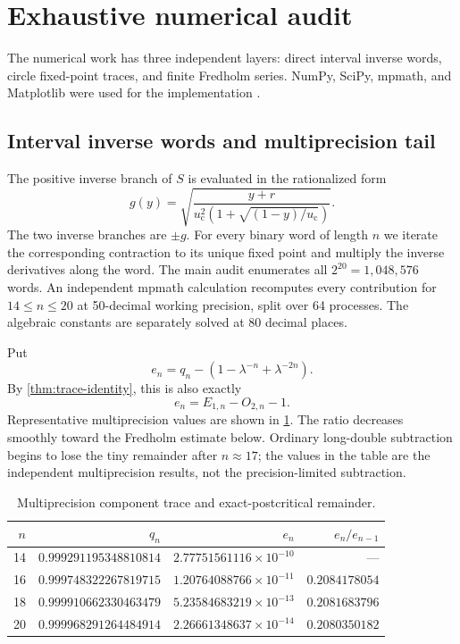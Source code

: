 \documentclass[11pt]{article}
\theoremstyle{definition}
\theoremstyle{remark}
\newcommand{\uc}{u_{\mathrm c}}
\begin{document}
\section{Exhaustive numerical audit}
\label{sec:numerics}

The numerical work has three independent layers: direct interval inverse
words, circle fixed-point traces, and finite Fredholm series.  NumPy, SciPy,
mpmath, and Matplotlib were used for the implementation
\citep{HarrisEtAl2020,VirtanenEtAl2020,JohanssonEtAl2025,Hunter2007}.

\subsection{Interval inverse words and multiprecision tail}

The positive inverse branch of $S$ is evaluated in the rationalized form
\begin{equation}\label{eq:inverse-branch}
 g(y)=
 \sqrt{
 \frac{y+r}{\uc^2\left(1+\sqrt{(1-y)/\uc}\right)}}.
\end{equation}
The two inverse branches are $\pm g$.  For every binary word of length $n$ we
iterate the corresponding contraction to its unique fixed point and multiply
the inverse derivatives along the word.  The main audit enumerates all
$2^{20}=1{,}048{,}576$ words.  An independent mpmath calculation recomputes
every contribution for $14\le n\le20$ at 50-decimal working precision, split
over 64 processes.  The algebraic constants are separately solved at 80
decimal places.

Put
\begin{equation}\label{eq:e-definition}
 e_n=q_n-\left(1-\lambda^{-n}+\lambda^{-2n}\right).
\end{equation}
By \cref{thm:trace-identity}, this is also exactly
\begin{equation}\label{eq:e-trace}
 e_n=E_{1,n}-O_{2,n}-1.
\end{equation}
Representative multiprecision values are shown in \cref{tab:tail}.  The ratio
decreases smoothly toward the Fredholm estimate below.  Ordinary long-double
subtraction begins to lose the tiny remainder after $n\approx17$; the values
in the table are the independent multiprecision results, not the
precision-limited subtraction.

\begin{table}[H]
\centering
\small
\caption{Multiprecision component trace and exact-postcritical remainder.}
\label{tab:tail}
\begin{tabular}{rrrr}
\toprule
$n$ & $q_n$ & $e_n$ & $e_n/e_{n-1}$\\
\midrule
14 & $0.999291195348810814$ & $2.77751561116\times10^{-10}$ & ---\\
16 & $0.999748322267819715$ & $1.20764088766\times10^{-11}$ & $0.2084178054$\\
18 & $0.999910662330463479$ & $5.23584683219\times10^{-13}$ & $0.2081683796$\\
20 & $0.999968291264484914$ & $2.26661348637\times10^{-14}$ & $0.2080350182$\\
\bottomrule
\end{tabular}
\end{table}
\end{document}
